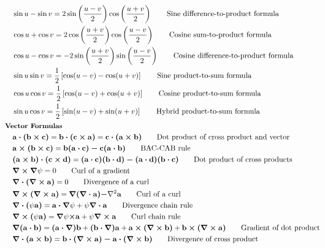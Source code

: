 \documentclass[10pt]{article}
\newcommand{\ve}[1]{\boldsymbol{\mathbf{#1}}}
\newcommand{\lrp}[1]{\left( #1 \right)}
\newcommand{\lrb}[1]{\left[ #1 \right]}
\begin{document}
\begin{multicols}{2}
\begin{align*}
		& \sin u - \sin v = 2 \sin \lrp{\frac{u-v}{2}} \cos \lrp{\frac{u+v}{2}}	\tag*{Sine difference-to-product formula} \\
		& \cos u + \cos v = 2 \cos \lrp{\frac{u+v}{2}} \cos \lrp{\frac{u-v}{2}}	\tag*{Cosine sum-to-product formula} \\
		& \cos u - \cos v = -2 \sin \lrp{\frac{u+v}{2}} \sin \lrp{\frac{u-v}{2}}	\tag*{Cosine difference-to-product formula} \\
		& \sin u \sin v = \frac{1}{2} \lrb{\cos(u - v) - \cos(u+v)}	\tag*{Sine product-to-sum formula} \\
		& \cos u \cos v = \frac{1}{2} \lrb{\cos(u - v) + \cos(u+v)}	\tag*{Cosine product-to-sum formula} \\
		& \sin u \cos v = \frac{1}{2} \lrb{\sin(u - v) + \sin(u+v)}	\tag*{Hybrid product-to-sum formula} \\
	& \small \hspace{-10pt} \textbf{Vector Formulas} \small \\
		& \ve{a \cdot (b \times c)} = \ve{b \cdot (c \times a)} = \ve{c \cdot (a \times b)}	\tag*{Dot product of cross product and vector} \\
		& \ve{a \times (b \times c)} = \ve{b(a \cdot c) - c(a \cdot b)}	 	\tag*{BAC-CAB rule} \\
		& \ve{(a \times b) \cdot (c \times d)} = \ve{(a \cdot c)(b \cdot d) - (a \cdot d)(b \cdot c)}	\tag*{Dot product of cross products} \\
		& \ve{\nabla \times \nabla}\psi = 0		\tag*{Curl of a gradient} \\
		& \ve{\nabla \cdot (\nabla \times a)} = 0	\tag*{Divergence of a curl} \\
		& \ve{\nabla \times (\nabla \times a)} = \ve{\nabla(\nabla \cdot a)-}\nabla^2\ve{a} \tag*{Curl of a curl} \\
		& \ve{\nabla \cdot (}\psi\ve{a)} = \ve{a \cdot \nabla}\psi + \psi\ve{\nabla \cdot a}	\tag*{Divergence chain rule} \\
		& \ve{\nabla \times (} \psi \ve{a)} = \ve{\nabla} \psi \ve{\times a} + \psi \ve{\nabla \times a}	\tag*{Curl chain rule} \\
		& \ve{\nabla (a \cdot b)} = \ve{(a \cdot \nabla)b} + \ve{(b \cdot \nabla)a} + \ve{a \times (\nabla \times b)} + \ve{b \times (\nabla \times a)}	\tag*{Gradient of dot product} \\
		& \ve{\nabla \cdot (a \times b)} = \ve{b \cdot (\nabla \times a) - a \cdot (\nabla \times b)}	\tag*{Divergence of cross product} \\

\end{align*}
\end{multicols}
\end{document}
